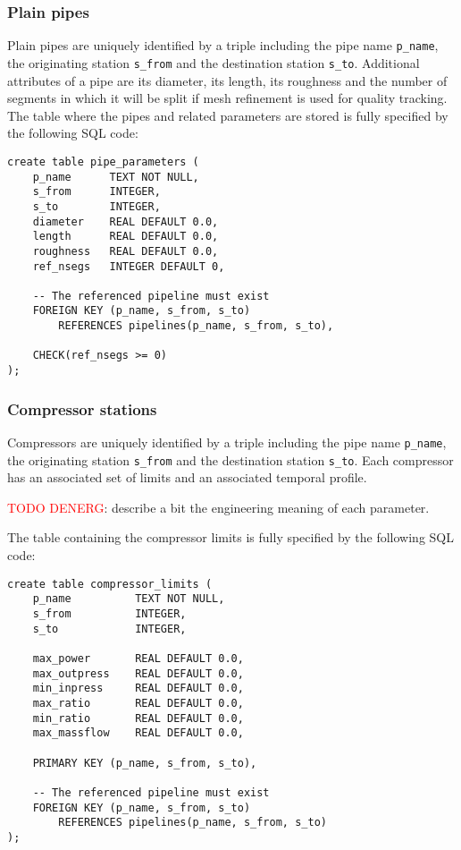 \subsubsection{Plain pipes}
Plain pipes are uniquely identified by a triple including the pipe
name \texttt{p\_name}, the originating station \texttt{s\_from} and the destination
station \texttt{s\_to}. Additional attributes of a pipe are its diameter,
its length, its roughness and the number of segments in which it will be split
if mesh refinement is used for quality tracking. The table where the pipes and
related parameters are stored is fully specified by the following SQL code:
\begin{verbatim}
create table pipe_parameters (
    p_name      TEXT NOT NULL,
    s_from      INTEGER,
    s_to        INTEGER,
    diameter    REAL DEFAULT 0.0,
    length      REAL DEFAULT 0.0,
    roughness   REAL DEFAULT 0.0,
    ref_nsegs   INTEGER DEFAULT 0,

    -- The referenced pipeline must exist
    FOREIGN KEY (p_name, s_from, s_to)
        REFERENCES pipelines(p_name, s_from, s_to),

    CHECK(ref_nsegs >= 0)
);
\end{verbatim}
\subsubsection{Compressor stations}
Compressors are uniquely identified by a triple including the pipe
name \texttt{p\_name}, the originating station \texttt{s\_from} and the destination
station \texttt{s\_to}. Each compressor has an associated set of limits and an
associated temporal profile.

\textcolor{red}{TODO DENERG}: describe a bit the engineering meaning of each parameter.

The table containing the compressor limits is fully specified by the following
SQL code:
\begin{verbatim}
create table compressor_limits (
    p_name          TEXT NOT NULL,
    s_from          INTEGER,
    s_to            INTEGER,

    max_power       REAL DEFAULT 0.0,
    max_outpress    REAL DEFAULT 0.0,
    min_inpress     REAL DEFAULT 0.0,
    max_ratio       REAL DEFAULT 0.0,
    min_ratio       REAL DEFAULT 0.0,
    max_massflow    REAL DEFAULT 0.0,

    PRIMARY KEY (p_name, s_from, s_to),

    -- The referenced pipeline must exist
    FOREIGN KEY (p_name, s_from, s_to)
        REFERENCES pipelines(p_name, s_from, s_to)
);
\end{verbatim}


